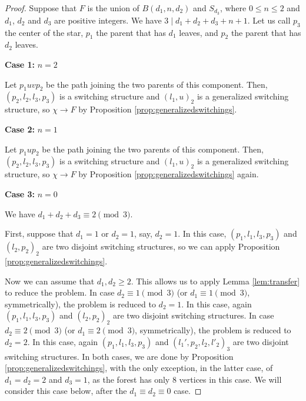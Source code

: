 \documentclass[11pt]{article}
\begin{document}
\begin{proof}
    Suppose that $F$ is the union of $B(d_1,n,d_2)$ and $S_{d_3}$, where $0 \leq n \leq 2$ and $d_1$, $d_2$ and $d_3$ are positive integers. We have $3 \mid d_1+d_2+d_3+n+1$. Let us call $p_3$ the center of the star, $p_1$ the parent that has $d_1$ leaves, and $p_2$ the parent that has $d_2$ leaves.
    
    \medskip

    \textbf{Case 1:} $n=2$

    Let $p_1uvp_2$ be the path joining the two parents of this component. Then, $(p_2,l_2,l_3,p_3)$ is a switching structure and $(l_1,u)_2$ is a generalized switching structure, so $\chi \rightarrow F$ by Proposition \ref{prop:generalizedswitchings}.

    \medskip

    \textbf{Case 2:} $n=1$

    Let $p_1up_2$ be the path joining the two parents of this component. Then, $(p_2,l_2,l_3,p_3)$ is a switching structure and $(l_1,u)_2$ is a generalized switching structure, so $\chi \rightarrow F$ by Proposition \ref{prop:generalizedswitchings} again.

    \medskip

    \textbf{Case 3:} $n=0$

    We have $d_1+d_2+d_3 \equiv 2 \pmod 3$.

    First, suppose that $d_1=1$ or $d_2=1$, say, $d_2=1$. In this case, $(p_1,l_1,l_3,p_3)$ and $(l_2,p_2)_2$ are two disjoint switching structures, so we can apply Proposition \ref{prop:generalizedswitchings}.

    Now we can assume that $d_1, d_2 \geq 2$. This allows us to apply Lemma \ref{lem:transfer} to reduce the problem. In case $d_2 \equiv 1 \pmod 3$ (or $d_1 \equiv 1 \pmod 3$, symmetrically), the problem is reduced to $d_2=1$. In this case, again $(p_1,l_1,l_3,p_3)$ and $(l_2,p_2)_2$ are two disjoint switching structures. In case $d_2 \equiv 2 \pmod 3$ (or $d_1 \equiv 2 \pmod 3$, symmetrically), the problem is reduced to $d_2=2$. In this case, again $(p_1,l_1,l_3,p_3)$ and $(l_1',p_2,l_2,l'_2)_3$ are two disjoint switching structures. In both cases, we are done by Proposition \ref{prop:generalizedswitchings}, with the only exception, in the latter case, of $d_1=d_2=2$ and $d_3=1$, as the forest has only $8$ vertices in this case. We will consider this case below, after the $d_1 \equiv d_2 \equiv 0$ case.
  
    
    

\end{proof}
\end{document}
